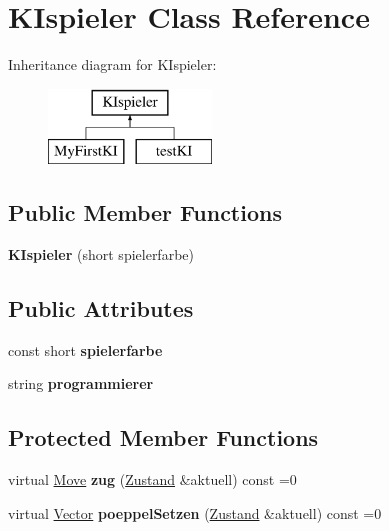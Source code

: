 \hypertarget{class_k_ispieler}{\section{K\-Ispieler Class Reference}
\label{class_k_ispieler}
}
Inheritance diagram for K\-Ispieler\-:\begin{figure}[H]
\begin{center}
\leavevmode
\includegraphics[height=2.000000cm]{class_k_ispieler}
\end{center}
\end{figure}
\subsection*{Public Member Functions}
\begin{DoxyCompactItemize}
\item 
\hypertarget{class_k_ispieler_a236f6bcb632fcf5584f23668843f28c3}{{\bfseries K\-Ispieler} (short spielerfarbe)}\label{class_k_ispieler_a236f6bcb632fcf5584f23668843f28c3}

\end{DoxyCompactItemize}
\subsection*{Public Attributes}
\begin{DoxyCompactItemize}
\item 
\hypertarget{class_k_ispieler_a57f2acc7c2c2f19b5f8db7912e8550a8}{const short {\bfseries spielerfarbe}}\label{class_k_ispieler_a57f2acc7c2c2f19b5f8db7912e8550a8}

\item 
\hypertarget{class_k_ispieler_a9bb08608afb5701e852435879ba60369}{string {\bfseries programmierer}}\label{class_k_ispieler_a9bb08608afb5701e852435879ba60369}

\end{DoxyCompactItemize}
\subsection*{Protected Member Functions}
\begin{DoxyCompactItemize}
\item 
\hypertarget{class_k_ispieler_a6007b5100ed30faaae57c13c71a61e39}{virtual \hyperlink{class_move}{Move} {\bfseries zug} (\hyperlink{class_zustand}{Zustand} \&aktuell) const =0}\label{class_k_ispieler_a6007b5100ed30faaae57c13c71a61e39}

\item 
\hypertarget{class_k_ispieler_ad91a31127d0a9f8a22c157f6d8c9cfcf}{virtual \hyperlink{class_vector}{Vector} {\bfseries poeppel\-Setzen} (\hyperlink{class_zustand}{Zustand} \&aktuell) const =0}\label{class_k_ispieler_ad91a31127d0a9f8a22c157f6d8c9cfcf}

\end{DoxyCompactItemize}
